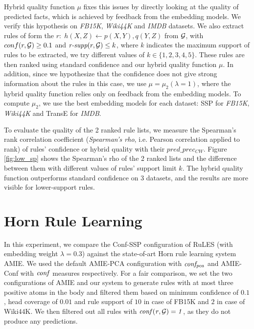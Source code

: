Hybrid quality function $\mu$ fixes this issues by directly looking at the quality of predicted facts, which is achieved by feedback from the embedding models. We verify this hypothesis on \textit{FB15K}, \textit{Wiki44K} and \textit{IMDB} datasets. We also extract rules of form the $r:\;h(X,Z) \leftarrow p(X,Y), q(Y,Z)$ from $\mathcal{G}$, with $conf(r,\mathcal{G}) \geq 0.1$ and $\textit{r-supp}(r,\mathcal{G}) \leq k$, where $k$ indicates the maximum support of rules to be extracted, we try different values of $k \in \{1,2,3,4,5\}$. These rules are then ranked using standard confidence and our hybrid quality function $\mu$. In addition, since we hypothesize that the confidence does not give strong information about the rules in this case, we use $\mu = \mu_2 (\lambda = 1)$, where the hybrid quality function relies only on feedback from the embedding models. To compute $\mu_2$, we use the best embedding models for each dataset: SSP for \textit{FB15K}, \textit{Wiki44K} and TransE for \textit{IMDB}.

To evaluate the quality of the 2 ranked rule lists, we measure the Spearman's rank correlation coefficient (\textit{Spearman's rho}, i.e. Pearson correlation applied to rank)  of rules' confidence or hybrid quality with their $pred\_prec_{CW}$. Figure \ref{fig:low_sp} shows the Spearman's rho of the 2 ranked lists and the difference between them with different values of rules' support limit $k$. The hybrid quality function outperforms standard confidence on 3 datasets, and the results are more visible for lower-support rules.
\section{Horn Rule Learning}
\label{sec:RuLES_vs_AMIE}

In this experiment, we compare the Conf-SSP configuration of RuLES (with embedding weight $\lambda = 0.3$) against the state-of-art Horn rule learning system AMIE. We used the default AMIE-PCA configuration with $\mathit{conf_{pca}}$ and %
AMIE-Conf with $\mathit{conf}$ measures respectively. For a fair comparison, we set the two configurations of AMIE and our system  to generate rules with at most three positive atoms in the body and  filtered them based on minimum confidence of $0.1$, head coverage of $0.01$ and rule support of $10$ in case of FB15K and $2$ in case of Wiki44K. We then filtered out all rules with $\mathit{conf(r,\mathcal{G}) = 1}$, as they %
do not produce any predictions.

